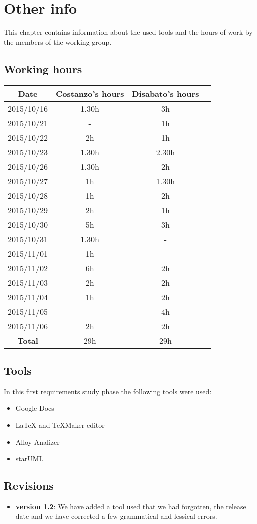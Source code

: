 \chapter{Other info}
\label{otherInfo}
This chapter contains information about the used tools and the hours of work by the members of the working group.

\clearpage

\section{Working hours}
\begin{table}[h!]
\begin{tabular}{cccc}
\hline
Date & Costanzo's hours & Disabato's hours  &    \\ \hline
2015/10/16 & 1.30h & 3h &    \\ \hline
2015/10/21 & - & 1h &    \\ \hline
2015/10/22 & 2h & 1h &    \\ \hline
2015/10/23 & 1.30h & 2.30h &    \\ \hline
2015/10/26 & 1.30h & 2h &    \\ \hline
2015/10/27 & 1h & 1.30h &    \\ \hline
2015/10/28 & 1h & 2h &    \\ \hline
2015/10/29 & 2h & 1h & \\ \hline
2015/10/30 & 5h & 3h &    \\ \hline
2015/10/31 & 1.30h & - &    \\ \hline
2015/11/01 & 1h & - &    \\ \hline
2015/11/02 & 6h & 2h &    \\ \hline
2015/11/03 & 2h & 2h &    \\ \hline
2015/11/04 & 1h & 2h &    \\ \hline
2015/11/05 & - & 4h &    \\ \hline
2015/11/06 & 2h & 2h &    \\ \hline
\textbf{Total} & 29h & 29h &    \\ \hline
\end{tabular}
\end{table}

\section{Tools}
In this first requirements study phase the following tools were used:
\begin{itemize}
	\item Google Docs
	\item \LaTeX{} and TeXMaker editor
	\item Alloy Analizer
	\item starUML
\end{itemize}

\section{Revisions}
\begin{itemize}
	\item \textbf{version 1.2}: We have added a tool used that we had forgotten, the release date and we have corrected a few grammatical and lessical errors.
\end{itemize}

\acresetall